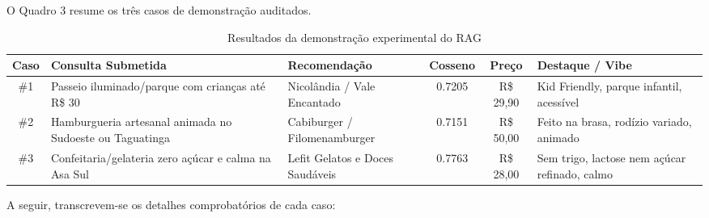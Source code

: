 \documentclass[11pt,a4paper]{article}
\begin{document}
O Quadro 3 resume os três casos de demonstração auditados.

\begin{table}[!htbp]
\centering
\small
\renewcommand{\arraystretch}{1.03}
\caption{Resultados da demonstração experimental do RAG}
\begin{tabularx}{\textwidth}{c p{3.6cm} p{3.2cm} c c X}
\toprule
\textbf{Caso} & \textbf{Consulta Submetida} & \textbf{Recomendação} & \textbf{Cosseno} & \textbf{Preço} & \textbf{Destaque / Vibe} \\
\midrule
\#1 & Passeio iluminado/parque com crianças até R\$ 30 & Nicolândia / Vale Encantado & 0.7205 & R\$ 29,90 & Kid Friendly, parque infantil, acessível \\
\#2 & Hamburgueria artesanal animada no Sudoeste ou Taguatinga & Cabiburger / Filomenamburger & 0.7151 & R\$ 50,00 & Feito na brasa, rodízio variado, animado \\
\#3 & Confeitaria/gelateria zero açúcar e calma na Asa Sul & Lefit Gelatos e Doces Saudáveis & 0.7763 & R\$ 28,00 & Sem trigo, lactose nem açúcar refinado, calmo \\
\bottomrule
\end{tabularx}
\vspace{0.1cm}
\end{table}

A seguir, transcrevem-se os detalhes comprobatórios de cada caso:
\end{document}
